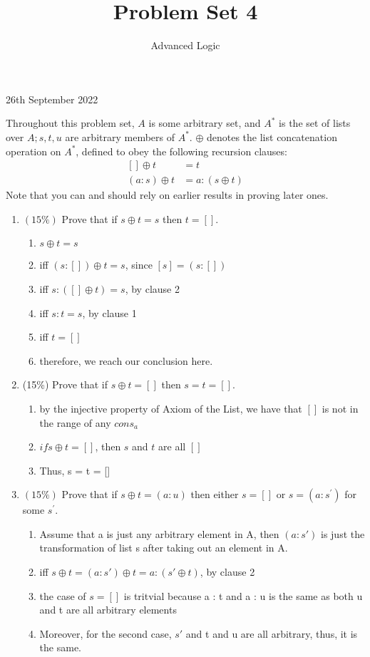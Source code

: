 \documentclass[10pt]{article}
\title{Problem Set 4 }
\author{Advanced Logic}
\date{}
\begin{document}
\maketitle

26th September 2022

Throughout this problem set, $A$ is some arbitrary set, and $A^{*}$ is the set of lists over $A ; s, t, u$ are arbitrary members of $A^{*}$. $\oplus$ denotes the list concatenation operation on $A^{*}$, defined to obey the following recursion clauses:
$$
\begin{aligned}
{[] \oplus t } &=t \\
(a: s) \oplus t &=a:(s \oplus t)
\end{aligned}
$$
Note that you can and should rely on earlier results in proving later ones.

\begin{enumerate}
  \item $(15 \%)$ Prove that if $s \oplus t=s$ then $t=[]$.
    \begin{enumerate}
        \item $s \oplus t = s$
        \item iff $(s:[]) \oplus t = s$, since $[s] = (s:[])$ 
        \item iff $s:([]\oplus t) = s$, by clause 2
        \item iff $s : t = s$, by clause 1
        \item iff $t = []$
        \item therefore, we reach our conclusion here.
    \end{enumerate}
  \item (15\%) Prove that if $s \oplus t=[]$ then $s=t=[]$.
    \begin{enumerate}
        \item by the injective property of Axiom of the List, we have that $[]$ is not in the range of any $cons_{a}$
        \item $if s \oplus t = []$, then $s$ and $t$ are all $[]$
        \item Thus, s = t = []
    \end{enumerate}

  \item $(15 \%)$ Prove that if $s \oplus t=(a: u)$ then either $s=[]$ or $s=\left(a: s^{\prime}\right)$ for some $s^{\prime}$.
  \begin{enumerate}
    \item Assume that a is just any arbitrary element in A, then $(a : s')$ is just the transformation of list s after taking out an element in A. 
    \item iff $s \oplus t = (a:s') \oplus t = a :(s' \oplus t)$, by clause 2
    \item the case of $s = []$ is tritvial because a : t and a : u is the same as both u and t are all arbitrary elements 
    \item Moreover, for the second case, $s'$ and t and u are all arbitrary, thus, it is the same. 

  \end{enumerate}

\end{enumerate}
\end{document}

